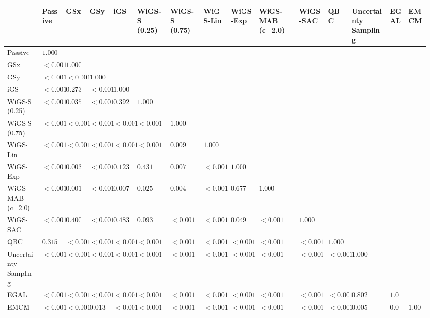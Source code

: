 \begin{tabular}{lllllllllllllll}
\toprule
 & Passive & GSx & GSy & iGS & WiGS-S (0.25) & WiGS-S (0.75) & WiGS-Lin & WiGS-Exp & WiGS-MAB (c=2.0) & WiGS-SAC & QBC & Uncertainty Sampling & EGAL & EMCM \\
\midrule
Passive & $1.000$ &  &  &  &  &  &  &  &  &  &  &  &  &  \\
GSx & $<0.001$ & $1.000$ &  &  &  &  &  &  &  &  &  &  &  &  \\
GSy & $<0.001$ & $<0.001$ & $1.000$ &  &  &  &  &  &  &  &  &  &  &  \\
iGS & $<0.001$ & $0.273$ & $<0.001$ & $1.000$ &  &  &  &  &  &  &  &  &  &  \\
WiGS-S (0.25) & $<0.001$ & $0.035$ & $<0.001$ & $0.392$ & $1.000$ &  &  &  &  &  &  &  &  &  \\
WiGS-S (0.75) & $<0.001$ & $<0.001$ & $<0.001$ & $<0.001$ & $<0.001$ & $1.000$ &  &  &  &  &  &  &  &  \\
WiGS-Lin & $<0.001$ & $<0.001$ & $<0.001$ & $<0.001$ & $<0.001$ & $0.009$ & $1.000$ &  &  &  &  &  &  &  \\
WiGS-Exp & $<0.001$ & $0.003$ & $<0.001$ & $0.123$ & $0.431$ & $0.007$ & $<0.001$ & $1.000$ &  &  &  &  &  &  \\
WiGS-MAB (c=2.0) & $<0.001$ & $0.001$ & $<0.001$ & $0.007$ & $0.025$ & $0.004$ & $<0.001$ & $0.677$ & $1.000$ &  &  &  &  &  \\
WiGS-SAC & $<0.001$ & $0.400$ & $<0.001$ & $0.483$ & $0.093$ & $<0.001$ & $<0.001$ & $0.049$ & $<0.001$ & $1.000$ &  &  &  &  \\
QBC & $0.315$ & $<0.001$ & $<0.001$ & $<0.001$ & $<0.001$ & $<0.001$ & $<0.001$ & $<0.001$ & $<0.001$ & $<0.001$ & $1.000$ &  &  &  \\
Uncertainty Sampling & $<0.001$ & $<0.001$ & $<0.001$ & $<0.001$ & $<0.001$ & $<0.001$ & $<0.001$ & $<0.001$ & $<0.001$ & $<0.001$ & $<0.001$ & $1.000$ &  &  \\
EGAL & $<0.001$ & $<0.001$ & $<0.001$ & $<0.001$ & $<0.001$ & $<0.001$ & $<0.001$ & $<0.001$ & $<0.001$ & $<0.001$ & $<0.001$ & $0.802$ & $1.000$ &  \\
EMCM & $<0.001$ & $<0.001$ & $0.013$ & $<0.001$ & $<0.001$ & $<0.001$ & $<0.001$ & $<0.001$ & $<0.001$ & $<0.001$ & $<0.001$ & $0.005$ & $0.035$ & $1.000$ \\
\bottomrule
\end{tabular}
